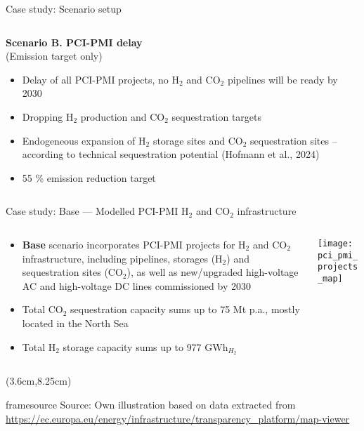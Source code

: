 \documentclass[10pt,aspectratio=169,dvipsnames]{beamer}
\newcommand{\source}[1]{\begin{textblock*}{10cm}(3.6cm,8.25cm)
    \begin{beamercolorbox}[ht=0.5cm,right]{framesource}
        \usebeamerfont{framesource}\usebeamercolor[fg]{framesource} Source: {#1}
    \end{beamercolorbox}
\end{textblock*}}
\begin{document}
\begin{frame}{Case study: Scenario setup}
\begin{columns}
    \begin{column}{.31\textwidth}
        \begin{minipage}[t][.45\textheight]{\linewidth}
          \begin{exampleblock}{\textbf{Scenario B. PCI-PMI delay}\\(Emission target only)}
            \scriptsize
            \begin{itemize}
              \item \alert{Delay of all PCI-PMI projects, no H$_2$ and CO$_2$ pipelines will be ready by 2030}
              \item \alert{Dropping H$_2$ production and CO$_2$ sequestration targets}
              \item \alert{Endogeneous expansion of H$_2$ storage sites and CO$_2$ sequestration sites} -- according to technical sequestration potential (Hofmann et al., 2024)
              \item 55 \% emission reduction target
            \end{itemize}
          \end{exampleblock}
        \end{minipage}
    \end{column}
  \end{columns}

\end{frame}

\begin{frame}{Case study: Base --- Modelled PCI-PMI H$_2$ and CO$_2$ infrastructure}

  \begin{columns}
    \begin{column}{0.53\textwidth}
      \footnotesize
      \begin{itemize}
        \setlength\itemsep{.8em}
        \item \textbf{Base} scenario incorporates \alert{PCI-PMI} projects for \alert{H$_2$} and \alert{CO$_2$} infrastructure, including pipelines, storages (H$_2$) and sequestration sites (CO$_2$), as well as new/upgraded \alert{high-voltage AC} and \alert{high-voltage DC} lines \alert{commissioned by 2030}
        \item Total CO$_2$ sequestration capacity sums up to \alert{75 Mt p.a.}, mostly located in the North Sea
        \item Total H$_2$ storage capacity sums up to \alert{977 GWh$_{H_2}$}
      \end{itemize}
    \end{column}
    \begin{column}{0.47\textwidth}
      \texttt{[image: pci\_pmi\_projects\_map]}
    \end{column}
  \end{columns}
  \source{Own illustration based on data extracted from \url{https://ec.europa.eu/energy/infrastructure/transparency_platform/map-viewer}}
\end{frame} 
\end{document}
